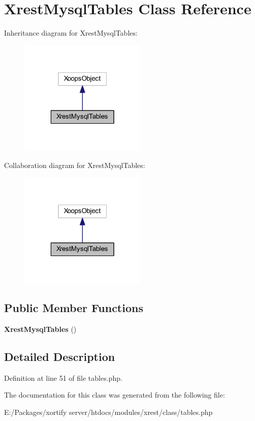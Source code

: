 \hypertarget{class_xrest_mysql_tables}{\section{Xrest\-Mysql\-Tables Class Reference}
\label{class_xrest_mysql_tables}
}


Inheritance diagram for Xrest\-Mysql\-Tables\-:
\nopagebreak
\begin{figure}[H]
\begin{center}
\leavevmode
\includegraphics[width=172pt]{class_xrest_mysql_tables__inherit__graph}
\end{center}
\end{figure}


Collaboration diagram for Xrest\-Mysql\-Tables\-:
\nopagebreak
\begin{figure}[H]
\begin{center}
\leavevmode
\includegraphics[width=172pt]{class_xrest_mysql_tables__coll__graph}
\end{center}
\end{figure}
\subsection*{Public Member Functions}
\begin{DoxyCompactItemize}
\item 
\hypertarget{class_xrest_mysql_tables_a293f4ff8a6897e71d18797e3d87b5907}{{\bfseries Xrest\-Mysql\-Tables} ()}\label{class_xrest_mysql_tables_a293f4ff8a6897e71d18797e3d87b5907}

\end{DoxyCompactItemize}


\subsection{Detailed Description}


Definition at line 51 of file tables.\-php.



The documentation for this class was generated from the following file\-:\begin{DoxyCompactItemize}
\item 
E\-:/\-Packages/xortify server/htdocs/modules/xrest/class/tables.\-php\end{DoxyCompactItemize}
